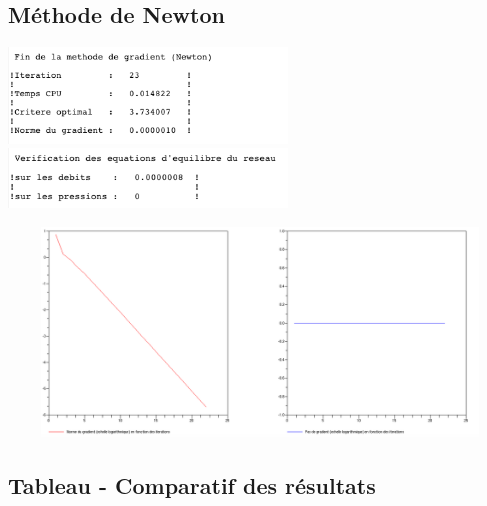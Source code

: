 \subsection{Méthode de Newton}

\begin{center}
  \includegraphics[width=20em,valign=t]{d_newton.png}
  \includegraphics[width=20em,valign=t]{d_newton_v.png}

  \includegraphics[width=40em,height=15em]{d_newton_f.png}
\end{center}

\subsection{Tableau - Comparatif des résultats}

